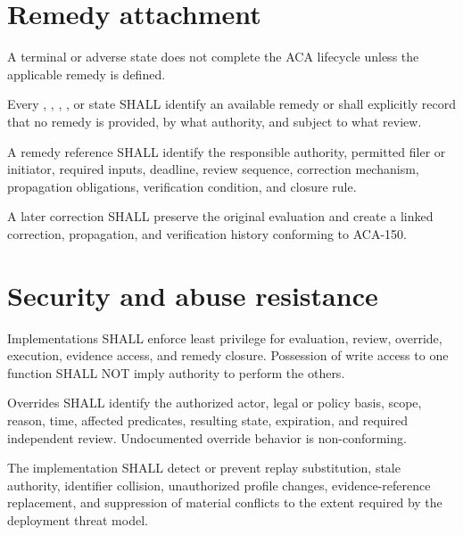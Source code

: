 \section{Remedy attachment}
A terminal or adverse state does not complete the ACA lifecycle unless the
applicable remedy is defined.

\begin{requirement}[ACA-120-043]
Every , , , , or
 state SHALL identify an available remedy or shall explicitly
record that no remedy is provided, by what authority, and subject to what review.
\end{requirement}

\begin{requirement}[ACA-120-044]
A remedy reference SHALL identify the responsible authority, permitted filer or
initiator, required inputs, deadline, review sequence, correction mechanism,
propagation obligations, verification condition, and closure rule.
\end{requirement}

\begin{requirement}[ACA-120-045]
A later correction SHALL preserve the original evaluation and create a linked
correction, propagation, and verification history conforming to ACA-150.
\end{requirement}

\section{Security and abuse resistance}

\begin{requirement}[ACA-120-046]
Implementations SHALL enforce least privilege for evaluation, review, override,
execution, evidence access, and remedy closure. Possession of write access to
one function SHALL NOT imply authority to perform the others.
\end{requirement}

\begin{requirement}[ACA-120-047]
Overrides SHALL identify the authorized actor, legal or policy basis, scope,
reason, time, affected predicates, resulting state, expiration, and required
independent review. Undocumented override behavior is non-conforming.
\end{requirement}

\begin{requirement}[ACA-120-048]
The implementation SHALL detect or prevent replay substitution, stale authority,
identifier collision, unauthorized profile changes, evidence-reference
replacement, and suppression of material conflicts to the extent required by
the deployment threat model.
\end{requirement}


